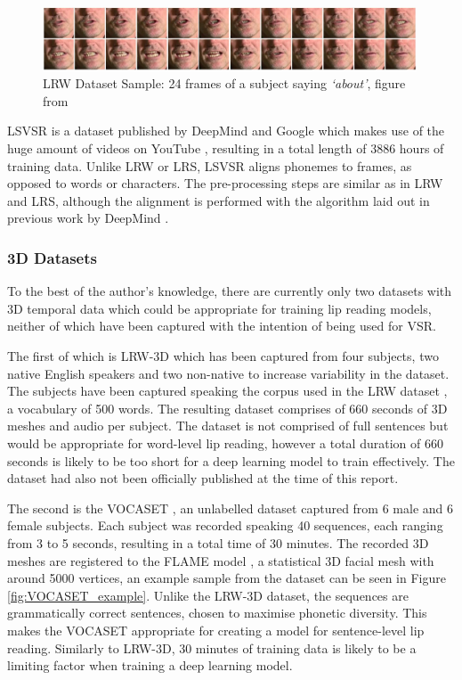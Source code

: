 \begin{figure}[h]
    \centering
        \includegraphics[width=0.99\textwidth]{figures/lit_review/lrw_one_second.png}
    \caption{LRW Dataset Sample: 24 frames of a subject saying \textit{`about'}, figure from \cite{Chung2016}}\label{fig:LRW_One_Second}
\end{figure}

LSVSR is a dataset published by DeepMind and Google which makes use of the huge amount of videos on YouTube \cite{Shillingford2018}, resulting in a total length of 3886 hours of training data.
Unlike LRW or LRS, LSVSR aligns phonemes to frames, as opposed to words or characters.
The pre-processing steps are similar as in LRW and LRS, although the alignment is performed with the algorithm laid out in previous work by DeepMind \cite{Liao2013}.

\subsubsection{3D Datasets} \label{3D Datasets}
To the best of the author's knowledge, there are currently only two datasets with 3D temporal data which could be appropriate for training lip reading models, neither of which have been captured with the intention of being used for VSR.

The first of which is LRW-3D \cite{Tzirakis2019} which has been captured from four subjects, two native English speakers and two non-native to increase variability in the dataset.
The subjects have been captured speaking the corpus used in the LRW dataset \cite{Chung2016}, a vocabulary of 500 words.
The resulting dataset comprises of 660 seconds of 3D meshes and audio per subject.
The dataset is not comprised of full sentences but would be appropriate for word-level lip reading, however a total duration of 660 seconds is likely to be too short for a deep learning model to train effectively.
The dataset had also not been officially published at the time of this report.

The second is the VOCASET \cite{Cudeiro2019}, an unlabelled dataset captured from 6 male and 6 female subjects.
Each subject was recorded speaking 40 sequences, each ranging from 3 to 5 seconds, resulting in a total time of 30 minutes.
The recorded 3D meshes are registered to the FLAME model \cite{Li2017}, a statistical 3D facial mesh with around 5000 vertices, an example sample from the dataset can be seen in Figure \ref{fig:VOCASET_example}.
Unlike the LRW-3D dataset, the sequences are grammatically correct sentences, chosen to maximise phonetic diversity.
This makes the VOCASET appropriate for creating a model for sentence-level lip reading.
Similarly to LRW-3D, 30 minutes of training data is likely to be a limiting factor when training a deep learning model.


